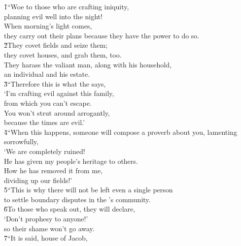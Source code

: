 \begin{poetry}
\poeml {}
\v{1}``Woe to those who are crafting iniquity, \\
\poeml planning evil well into the night! \\
\poeml When morning's light comes, \\
\poemll    they carry out their plans because they have the power to do so. \\
\poeml \v{2}They covet fields and seize them; \\
\poemll    they covet houses, and grab them, too. \\
\poeml They harass the valiant man, along with his household, \\
\poemll    an individual and his estate. \\
\poeml \v{3}``Therefore this is what the  says, \\
\poeml `I'm crafting evil against this family, \\
\poemll    from which you can't escape. \\
\poeml You won't strut around arrogantly, \\
\poemll    because the times are evil.' \\
\poeml \v{4}``When this happens, someone will compose a proverb about you, lamenting sorrowfully, \\
\poemll    `We are completely ruined! \\
\poemlll       He has given my people's heritage to others. \\
\poemll    How he has removed it from me, \\
\poemlll       dividing up our fields!' \\
\poeml \v{5}``This is why there will not be left even a single person \\
\poemll    to settle boundary disputes in the 's community. \\
\poeml \v{6}To those who speak out, they will declare, \\
\poemll    `Don't prophesy to anyone!' \\
\poemlll       so their shame won't go away. \\
\poeml \v{7}``It is said, house of Jacob, \\

\end{poetry}
